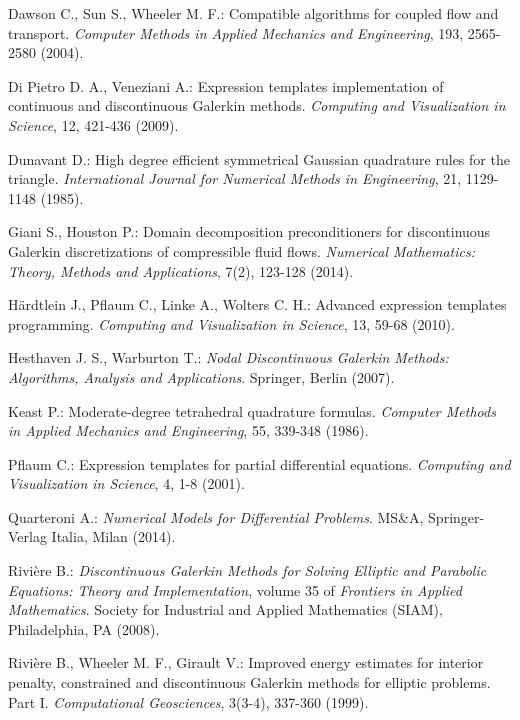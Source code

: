 \documentclass[12pt, a4paper]{article}
\theoremstyle{definition}
\theoremstyle{plain}
\theoremstyle{plain}
\theoremstyle{definition}
\begin{document}
\begin{thebibliography}{99}
	Dawson C., Sun S., Wheeler M. F.: Compatible algorithms for coupled flow 
	and transport. \emph{Computer Methods in Applied Mechanics and 
	Engineering}, 193, 2565-2580 (2004).

	Di Pietro D. A., Veneziani A.: Expression templates implementation of continuous and discontinuous Galerkin methods. \emph{Computing and Visualization in Science}, 12, 421-436 (2009).
	
	Dunavant D.: High degree efficient symmetrical Gaussian quadrature rules 
	for the triangle. \emph{International Journal for Numerical Methods in 
	Engineering}, 21, 1129-1148 (1985).
	
	Giani S., Houston P.: Domain decomposition preconditioners for 
	discontinuous Galerkin discretizations of compressible fluid flows. 
	\emph{Numerical Mathematics: Theory, Methods and Applications}, 7(2), 
	123-128 (2014).
	
	H\"ardtlein J., Pflaum C., Linke A., Wolters C. H.: Advanced expression templates
	programming. \emph{Computing and Visualization in Science}, 13, 59-68 (2010).
	
	Hesthaven J. S., Warburton T.: \emph{Nodal Discontinuous Galerkin Methods: 
	Algorithms, Analysis and Applications}. Springer, Berlin (2007).
	
	Keast P.: Moderate-degree tetrahedral quadrature formulas. \emph{Computer 
	Methods in Applied Mechanics and Engineering}, 55, 339-348 (1986).

	Pflaum C.: Expression templates for partial differential equations. \emph{Computing and Visualization in Science}, 4, 1-8 (2001).
	
	Quarteroni A.: \emph{Numerical Models for Differential Problems}. MS\&A, 
	Springer-Verlag Italia, Milan (2014).
	
	Rivière B.: \emph{Discontinuous Galerkin Methods for Solving Elliptic and 
	Parabolic Equations: Theory and Implementation}, volume 35 of 
	\emph{Frontiers in Applied Mathematics}. Society for Industrial and Applied 
	Mathematics (SIAM), Philadelphia, PA (2008).
	
	Rivière B., Wheeler M. F., Girault V.: Improved energy estimates for 
	interior penalty, constrained and discontinuous Galerkin methods for 
	elliptic problems. Part I. \emph{Computational Geosciences}, 3(3-4), 
	337-360 (1999).
	

\end{thebibliography}
\end{document}
